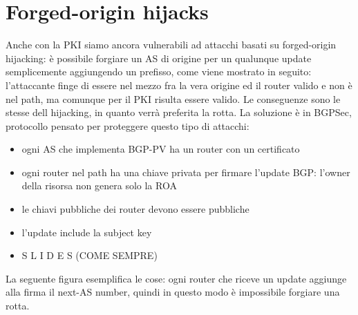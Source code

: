\documentclass[12pt, oneside]{extbook} %
\begin{document}
\section{Forged-origin hijacks}
Anche con la PKI siamo ancora vulnerabili ad attacchi basati su forged-origin hijacking: è possibile forgiare un AS di origine per un qualunque update semplicemente aggiungendo un prefisso, come viene mostrato in seguito:
l'attaccante finge di essere nel mezzo fra la vera origine ed il router valido e non è nel path, ma comunque per il PKI risulta essere valido. Le conseguenze sono le stesse dell hijacking, in quanto verrà preferita la rotta. La soluzione è in BGPSec, protocollo pensato per proteggere questo tipo di attacchi:
\begin{itemize}
	\item ogni AS che implementa BGP-PV ha un router con un certificato
	\item ogni router nel path ha una chiave privata per firmare l'update BGP: l'owner della risorsa non genera solo la ROA
	\item le chiavi pubbliche dei router devono essere pubbliche
	\item l'update include la subject key 
	\item S L I D E S (COME SEMPRE)
\end{itemize}
La seguente figura esemplifica le cose:
ogni router che riceve un update aggiunge alla firma il next-AS number, quindi in questo modo è impossibile forgiare una rotta.
\end{document}
